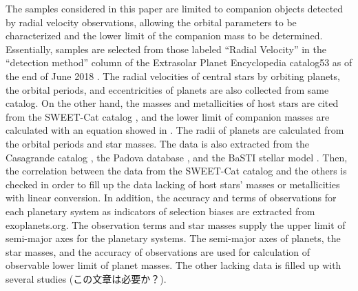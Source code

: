 \documentclass[twocolumn, dvipdfmx]{aastex62}
\begin{document}
\begin{CJK*}{UTF8}{min}
The samples considered in this paper are limited to companion objects detected by radial velocity observations, allowing the orbital parameters to be characterized and the lower limit of the companion mass to be determined. Essentially, samples are selected from those labeled “Radial Velocity” in the “detection method” column of the Extrasolar Planet Encyclopedia catalog53 as of the end of June 2018 \citep{2011A&A...532A..79S}. The radial velocities of central stars by orbiting planets, the orbital periods, and eccentricities of planets are also collected from same catalog. On the other hand, the masses and metallicities of host stars are cited from the SWEET-Cat catalog \citep{2018A&A...620A..58S}, and the lower limit of companion masses are calculated with an equation showed in \cite{2008ApJ...677.1324T}. The radii of planets are calculated from the orbital periods and star masses. The data is also extracted from the Casagrande catalog \citep{2011A&A...530A.138C}, the Padova database \citep{2000A&AS..141..371G}, and the BaSTI stellar model \citep{2018ApJ...856..125H}. Then, the correlation between the data from the SWEET-Cat catalog and the others is checked in order to fill up the data lacking of host stars' masses or metallicities with linear conversion. In addition, the accuracy and terms of observations for each planetary system as indicators of selection biases are extracted from exoplanets.org. The observation terms and star masses supply the upper limit of semi-major axes for the planetary systems. The semi-major axes of planets, the star masses, and the accuracy of observations are used for calculation of observable lower limit of planet masses. The other lacking data is filled up with several studies (この文章は必要か？).


\end{CJK*}
\end{document}
